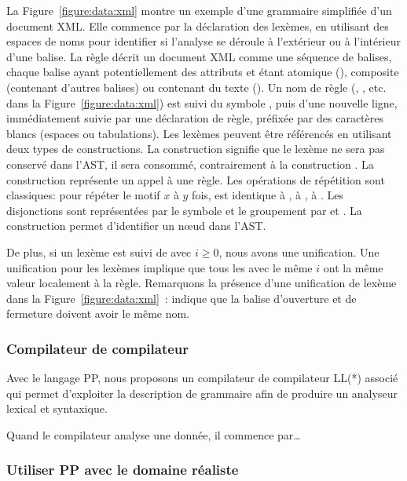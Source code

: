 La Figure~\ref{figure:data:xml} montre un exemple d'une grammaire simplifiée
d'un document XML. Elle commence par la déclaration des lexèmes, en utilisant
des espaces de noms pour identifier si l'analyse se déroule à l'extérieur ou à
l'intérieur d'une balise. La règle  décrit un document XML comme une
séquence de balises, chaque balise ayant potentiellement des attributs et étant
atomique (), composite (contenant d'autres balises) ou contenant
du texte (). Un nom de règle (,
,  etc. dans la Figure~\ref{figure:data:xml}) est
suivi du symbole \code{:}, puis d'une nouvelle ligne, immédiatement suivie par
une {\strong déclaration de règle}, préfixée par des caractères blancs (espaces
ou tabulations). Les lexèmes peuvent être référencés en utilisant deux types de
constructions. La construction  signifie que le lexème ne sera
pas conservé dans l'AST, il sera consommé, contrairement à la construction
. La construction  représente un appel à une règle.
Les opérations de répétition sont classiques:  pour répéter
le motif $x$ à $y$ fois,  est identique à , \code{+} à
, \code{*} à . Les disjonctions sont représentées
par le symbole \code{\mvert} et le groupement par \code{(} et \code{)}. La
construction  permet d'identifier un nœud dans l'AST.

De plus, si un lexème est suivi de \code{[$i$]} avec $i \geq 0$, nous avons une
unification. Une unification pour les lexèmes implique que tous les
 avec le même $i$ ont la même valeur localement à la règle.
Remarquons la présence d'une unification de lexème dans la
Figure~\ref{figure:data:xml}~:  indique que la balise
d'ouverture et de fermeture doivent avoir le même nom.

\subsubsection{Compilateur de compilateur}
\label{subsection:data:compiler-compiler}

Avec le langage PP, nous proposons un compilateur de compilateur LL(*) associé
qui permet d'exploiter la description de grammaire afin de produire un analyseur
lexical et syntaxique.

Quand le compilateur analyse une donnée, il commence par…

\subsubsection{Utiliser PP avec le domaine réaliste }

